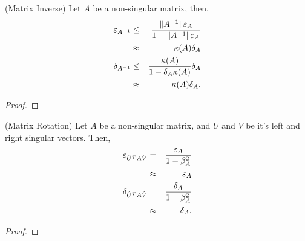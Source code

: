 \begin{proposition}(Matrix Inverse)
  Let $A$ be a non-singular matrix, then, 
  \begin{eqnarray}
    \varepsilon_{A^{-1}} 
    &\le& \frac{\|A^{-1}\| \varepsilon_{A}}{1 - \|A^{-1}\|\varepsilon_{A}} \\
      &\approx& \kappa(A) \delta_{A} \\
   \delta_{A^{-1}} 
      &\le& \frac{\kappa(A)}{1 - \delta_{A}\kappa(A)} \delta_{A} \\
      &\approx& \kappa(A) \delta_{A}.
  \end{eqnarray}
\end{proposition}
\begin{proof}
\end{proof}

\begin{proposition}(Matrix Rotation)
  Let $A$ be a non-singular matrix, and $U$ and $V$ be it's left and right singular vectors. Then, 
  \begin{eqnarray}
      \varepsilon_{\hat{U}^T A \hat{V}} &=& \frac{\varepsilon_{A}}{1 - \beta_A^2} \\
                         &\approx& \varepsilon_{A} \\
      \delta_{\hat{U}^T A \hat{V}} &=& \frac{\delta_{A}}{1 - \beta_A^2} \\
                         &\approx& \delta_{A}.
  \end{eqnarray}
\end{proposition}
\begin{proof}
\end{proof}

